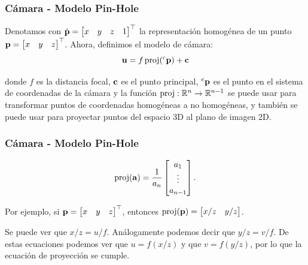 \begin{frame}
	\frametitle{Cámara - Modelo Pin-Hole}
	
	Denotamos con $\dot{\boldsymbol{\mathbf{p}}}=\begin{bmatrix}x & y & z & 1\end{bmatrix}^{\top}$ la representación homogénea de un punto $\boldsymbol{\mathbf{p}}=\begin{bmatrix}x & y & z\end{bmatrix}^{\top}$. Ahora, definimos el modelo de cámara:
	\begin{equation*}
		\boldsymbol{\mathbf{u}}=f\operatorname{proj}(\prescript{\mathrm{\mathrm{c}}}{}{\boldsymbol{\mathbf{p}}})+\boldsymbol{\mathbf{c}}
	\end{equation*}
	
	donde $f$ es la distancia focal, $\boldsymbol{\mathbf{c}}$ es el punto principal, $\prescript{\mathrm{\mathrm{c}}}{}{\boldsymbol{\mathbf{p}}}$ es el punto en el sistema de coordenadas de la cámara y la función $\operatorname{proj}:\mathbb{R}^{n}\rightarrow\mathbb{R}^{n- 1}$ se puede usar para transformar puntos de coordenadas homogéneas a no homogéneas, y también se puede usar para proyectar puntos del espacio 3D al plano de imagen 2D.	
\end{frame}

\begin{frame}
	\frametitle{Cámara - Modelo Pin-Hole}
	
    \footnotesize	
	\begin{equation*}
		\operatorname{proj}(\boldsymbol{\mathbf{a}})=
		\frac{1}{a_{n}}\begin{bmatrix}a_{1}\\
			\vdots\\
			a_{n-1}
		\end{bmatrix}.
	\end{equation*}
	
	Por ejemplo, si $\boldsymbol{\mathbf{p}}=\begin{bmatrix}x & y & z\end{bmatrix}^{\top}$, entonces $\operatorname{proj}(\boldsymbol{\mathbf{p}})=\begin{bmatrix}x/z & y/z\end{bmatrix}$.
	
	Se puede ver que $x/z=u/f$. Análogamente podemos decir que $y/z=v/f$. De estas ecuaciones podemos ver que $u=f(x/z)$ y que $v=f(y/z)$, por lo que la ecuación de proyección se cumple.
	
\end{frame}

